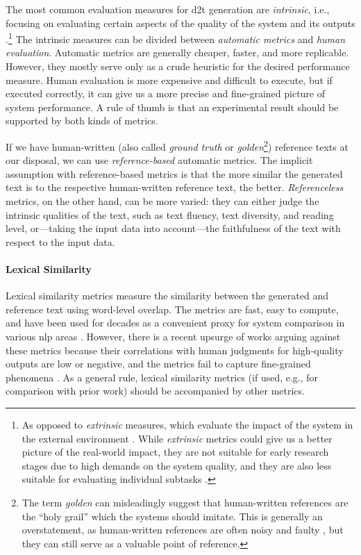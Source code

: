 {The most common evaluation measures for \ac{d2t} generation are \emph{intrinsic}, i.e., focusing on evaluating certain aspects of the quality of the system and its outputs \cite{gkatzia2015snapshot,celikyilmazEvaluationTextGeneration2021}.\footnote{As opposed to \emph{extrinsic} measures, which evaluate the impact of the system in the external environment \cite{celikyilmazEvaluationTextGeneration2021}. While \emph{extrinsic} metrics could give us a better picture of the real-world impact, they are not suitable for early research stages due to high demands on the system quality, and they are also less suitable for evaluating individual subtasks \cite{van2019best}.} The intrinsic measures can be divided between \emph{automatic metrics} and \emph{human evaluation}. Automatic metrics are generally cheaper, faster, and more replicable. However, they mostly serve only as a crude heuristic for the desired performance measure. Human evaluation is more expensive and difficult to execute, but if executed correctly, it can give us a more precise and fine-grained picture of system performance. A rule of thumb is that an experimental result should be supported by both kinds of metrics.


If we have human-written (also called \emph{ground truth} or \emph{golden}\footnote{The term \emph{golden} can misleadingly suggest that human-written references are the ``holy grail'' which the systems should imitate. This is generally an overstatement, as human-written references are often noisy and faulty \cite{dusekSemanticNoiseMatters2019,clarkAllThatHuman2021}, but they can still serve as a valuable point of reference.}) reference texts at our disposal, we can use \emph{reference-based}  automatic metrics. The implicit assumption with reference-based metrics is that the more similar the generated text is to the respective human-written reference text, the better. \emph{Referenceless} metrics, on the other hand, can be more varied: they can either judge the intrinsic qualities of the text, such as text fluency, text diversity, and reading level, or---taking the input data into account---the faithfulness of the text with respect to the input data.


\paragraph{Lexical Similarity} Lexical similarity metrics measure the similarity between the generated and reference text using word-level overlap. The metrics are fast, easy to compute, and have been used for decades as a convenient proxy for system comparison in various \ac{nlp} areas \cite{celikyilmazEvaluationTextGeneration2021}. However, there is a recent upsurge of works arguing against these metrics because their correlations with human judgments for high-quality outputs are low or negative, and the metrics fail to capture fine-grained phenomena \cite{mathurTangledBLEUReevaluating2020,kocmiShipNotShip2021,gehrmannRepairingCrackedFoundation2022}. As a general rule, lexical similarity metrics (if used, e.g., for comparison with prior work) should be accompanied by other metrics.

}
